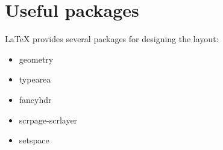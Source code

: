\documentclass{article}
\begin{document}
\section*{Useful packages}
LaTeX provides several packages for designing the layout:
\begin{itemize}
  \item geometry
  \item typearea
  \item fancyhdr
  \item scrpage-scrlayer
  \item setspace
\end{itemize}
\end{document}
